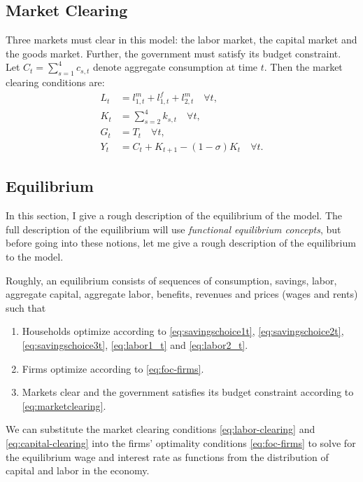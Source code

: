 \documentclass[BufferStockTheory]{subfiles}
\begin{document}
\subsection{Market Clearing}

Three markets must clear in this model: the labor market, the capital market and the goods market. Further, the government must satisfy its budget constraint. Let $C_t=\sum_{s=1}^4 c_{s,t}$ denote aggregate consumption at time $t.$
Then the market clearing conditions are:
\begin{subequations}
	\label{eq:marketclearing}
	\begin{align}
		L_t&=l_{1,t}^m+l_{1,t}^f + l_{2,t}^m\quad \forall t,\label{eq:labor-clearing}\\
		K_t&=\sum_{s=2}^4 k_{s,t}\quad \forall t, \label{eq:capital-clearing}\\
		G_t&=T_t\quad \forall t,\label{eq:govbudget}\\
		Y_t&=C_t + K_{t+1}-(1-\sigma)K_t \quad \forall t. \label{eq:goods-clearing}
	\end{align}
\end{subequations}


\subsection{Equilibrium}

In this section, I give a rough description of the equilibrium of the model. The full description of the equilibrium will use \emph{functional equilibrium concepts}, but before going into these notions, let me give a rough description of the equilibrium to the model. 

Roughly, an equilibrium consists of sequences of consumption, savings, labor, aggregate capital, aggregate labor, benefits, revenues and prices (wages and rents) such that
\begin{enumerate}
	\item Households optimize according to \eqref{eq:savingschoice1t}, \eqref{eq:savingschoice2t},
	 \eqref{eq:savingschoice3t}, \eqref{eq:labor1_t} and \eqref{eq:labor2_t}.
	\item Firms optimize according to \eqref{eq:foc-firms}.
	\item Markets clear and the government satisfies its budget constraint according to \eqref{eq:marketclearing}.
\end{enumerate}

We can substitute the market clearing conditions \eqref{eq:labor-clearing} and \eqref{eq:capital-clearing}  into the firms' optimality conditions \eqref{eq:foc-firms} to solve for the equilibrium wage and interest rate 
as functions from the distribution of capital and labor in the economy.
\end{document}

